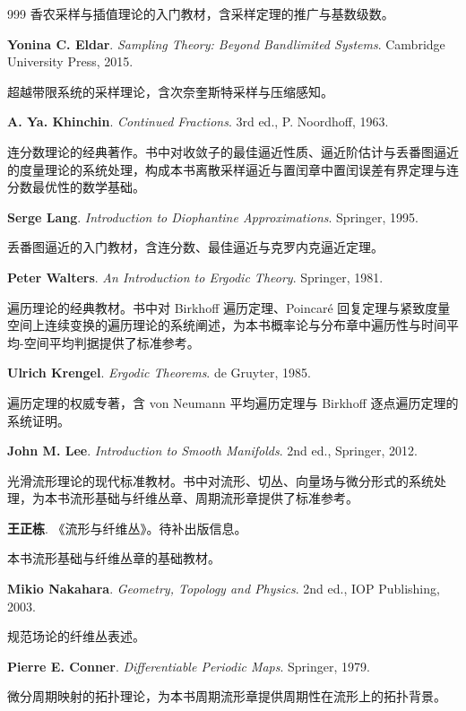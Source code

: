 \begin{thebibliography}{999}
香农采样与插值理论的入门教材，含采样定理的推广与基数级数。

 \textbf{Yonina C. Eldar}. \textit{Sampling Theory: Beyond Bandlimited Systems}. Cambridge University Press, 2015.

超越带限系统的采样理论，含次奈奎斯特采样与压缩感知。

 \textbf{A. Ya. Khinchin}. \textit{Continued Fractions}. 3rd ed., P. Noordhoff, 1963.

连分数理论的经典著作。书中对收敛子的最佳逼近性质、逼近阶估计与丢番图逼近的度量理论的系统处理，构成本书离散采样逼近与置闰章中置闰误差有界定理与连分数最优性的数学基础。

 \textbf{Serge Lang}. \textit{Introduction to Diophantine Approximations}. Springer, 1995.

丢番图逼近的入门教材，含连分数、最佳逼近与克罗内克逼近定理。

 \textbf{Peter Walters}. \textit{An Introduction to Ergodic Theory}. Springer, 1981.

遍历理论的经典教材。书中对 Birkhoff 遍历定理、Poincar\'e 回复定理与紧致度量空间上连续变换的遍历理论的系统阐述，为本书概率论与分布章中遍历性与时间平均-空间平均判据提供了标准参考。

 \textbf{Ulrich Krengel}. \textit{Ergodic Theorems}. de Gruyter, 1985.

遍历定理的权威专著，含 von Neumann 平均遍历定理与 Birkhoff 逐点遍历定理的系统证明。

 \textbf{John M. Lee}. \textit{Introduction to Smooth Manifolds}. 2nd ed., Springer, 2012.

光滑流形理论的现代标准教材。书中对流形、切丛、向量场与微分形式的系统处理，为本书流形基础与纤维丛章、周期流形章提供了标准参考。

 \textbf{王正栋}. 《流形与纤维丛》。待补出版信息。

本书流形基础与纤维丛章的基础教材。

 \textbf{Mikio Nakahara}. \textit{Geometry, Topology and Physics}. 2nd ed., IOP Publishing, 2003.

规范场论的纤维丛表述。

 \textbf{Pierre E. Conner}. \textit{Differentiable Periodic Maps}. Springer, 1979.

微分周期映射的拓扑理论，为本书周期流形章提供周期性在流形上的拓扑背景。


\end{thebibliography}
